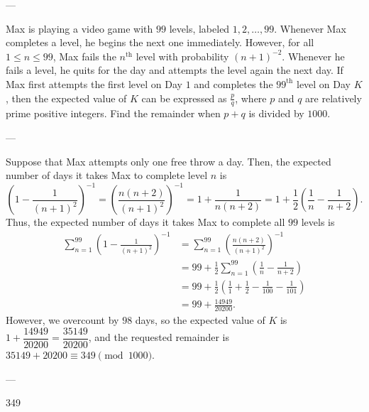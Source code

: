 
---

Max is playing a video game with $99$ levels, labeled $1,2,\ldots,99$. Whenever Max completes a level, he begins the next one immediately. However, for all $1\le n\le 99$, Max fails the $n^\text{th}$ level with probability $(n+1)^{-2}$. Whenever he fails a level, he quits for the day and attempts the level again the next day. If Max first attempts the first level on Day $1$ and completes the $99^\text{th}$ level on Day $K$, then the expected value of $K$ can be expressed as $\tfrac pq$, where $p$ and $q$ are relatively prime positive integers. Find the remainder when $p+q$ is divided by $1000$.

---

Suppose that Max attempts only one free throw a day. Then, the expected number of days it takes Max to complete level $n$ is $$\left(1-\frac1{(n+1)^2}\right)^{-1}=\left(\frac{n(n+2)}{(n+1)^2}\right)^{-1}=1+\frac1{n(n+2)}=1+\frac12\left(\frac1n-\frac1{n+2}\right).$$
Thus, the expected number of days it takes Max to complete all $99$ levels is
\begin{align*}
    \sum_{n=1}^{99}\left(1-\frac1{(n+1)^2}\right)^{-1}&=\sum_{n=1}^{99}\left(\frac{n(n+2)}{(n+1)^2}\right)^{-1}\\
    &=99+\frac12\sum_{n=1}^{99}\left(\frac1n-\frac1{n+2}\right)\\
    &=99+\frac12\left(\frac11+\frac12-\frac1{100}-\frac1{101}\right)\\
    &=99+\frac{14949}{20200}.
\end{align*}
However, we overcount by $98$ days, so the expected value of $K$ is $1+\dfrac{14949}{20200}=\dfrac{35149}{20200}$, and the requested remainder is $35149+20200\equiv 349\pmod{1000}$.

---

349
